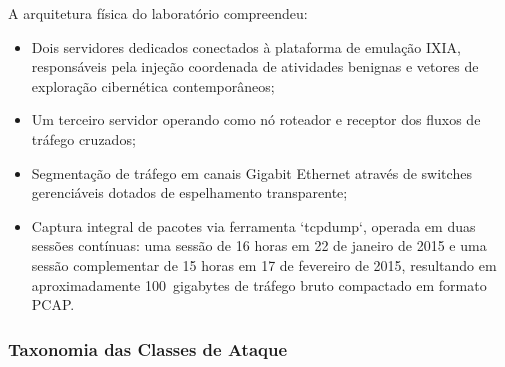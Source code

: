 A arquitetura física do laboratório compreendeu:
\begin{itemize}
    \item Dois servidores dedicados conectados à plataforma de emulação IXIA, responsáveis pela injeção coordenada de atividades benignas e vetores de exploração cibernética contemporâneos;
    \item Um terceiro servidor operando como nó roteador e receptor dos fluxos de tráfego cruzados;
    \item Segmentação de tráfego em canais Gigabit Ethernet através de switches gerenciáveis dotados de espelhamento transparente;
    \item Captura integral de pacotes via ferramenta `tcpdump`, operada em duas sessões contínuas: uma sessão de 16 horas em 22 de janeiro de 2015 e uma sessão complementar de 15 horas em 17 de fevereiro de 2015, resultando em aproximadamente 100~gigabytes de tráfego bruto compactado em formato PCAP.
\end{itemize}

\subsubsection{Taxonomia das Classes de Ataque}

